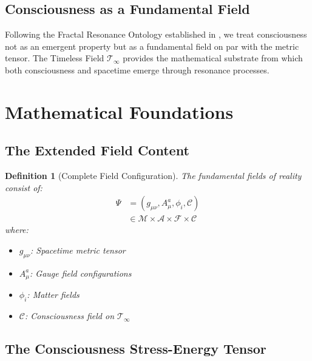 \documentclass[12pt,letterpaper]{article}
\newtheorem{definition}[theorem]{Definition}
\newcommand{\TF}{\mathcal{T}_\infty}
\begin{document}
\subsection{Consciousness as a Fundamental Field}

Following the Fractal Resonance Ontology established in \cite{Cohen2025}, we treat consciousness not as an emergent property but as a fundamental field on par with the metric tensor. The Timeless Field $\TF$ provides the mathematical substrate from which both consciousness and spacetime emerge through resonance processes.

\section{Mathematical Foundations}

\subsection{The Extended Field Content}

\begin{definition}[Complete Field Configuration]
The fundamental fields of reality consist of:
\begin{align}
\Psi &= (g_{\mu\nu}, A_\mu^a, \phi_i, \mathcal{C}) \\
&\in \mathcal{M} \times \mathcal{A} \times \mathcal{F} \times \mathscr{C}
\end{align}
where:
\begin{itemize}
\item $g_{\mu\nu}$: Spacetime metric tensor
\item $A_\mu^a$: Gauge field configurations  
\item $\phi_i$: Matter fields
\item $\mathcal{C}$: Consciousness field on $\TF$
\end{itemize}
\end{definition}

\subsection{The Consciousness Stress-Energy Tensor}
\end{document}
